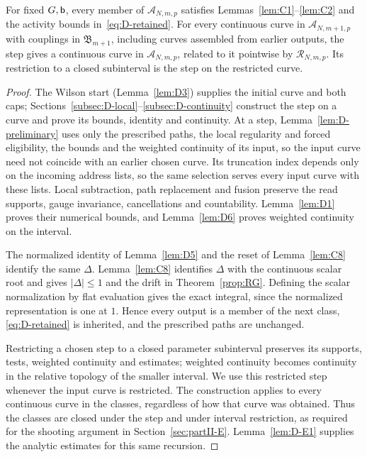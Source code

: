 \begin{lemma}\label{lem:D2}
For fixed $G,\mathsf{b}$, every member of $\mathcal A_{N,m,p}$ satisfies Lemmas~\ref{lem:C1}--\ref{lem:C2} and the activity bounds in~\eqref{eq:D-retained}. For every continuous curve in $\mathcal A_{N,m+1,p}$ with couplings in $\mathfrak B_{m+1}$, including curves assembled from earlier outputs, the step gives a continuous curve in $\mathcal A_{N,m,p}$, related to it pointwise by $\mathcal R_{N,m,p}$. Its restriction to a closed subinterval is the step on the restricted curve.
\end{lemma}
\begin{proof}
The Wilson start (Lemma~\ref{lem:D3}) supplies the initial curve and both caps; Sections~\ref{subsec:D-local}--\ref{subsec:D-continuity} construct the step on a curve and prove its bounds, identity and continuity. At a step, Lemma~\ref{lem:D-preliminary} uses only the prescribed paths, the local regularity and forced eligibility, the bounds and the weighted continuity of its input, so the input curve need not coincide with an earlier chosen curve. Its truncation index depends only on the incoming address lists, so the same selection serves every input curve with these lists. Local subtraction, path replacement and fusion preserve the read supports, gauge invariance, cancellations and countability. Lemma~\ref{lem:D1} proves their numerical bounds, and Lemma~\ref{lem:D6} proves weighted continuity on the interval.

The normalized identity of Lemma~\ref{lem:D5} and the reset of Lemma~\ref{lem:C8} identify the same $\Delta$. Lemma~\ref{lem:C8} identifies $\Delta$ with the continuous scalar root and gives $|\Delta|\le1$ and the drift in Theorem~\ref{prop:RG}. Defining the scalar normalization by flat evaluation gives the exact integral, since the normalized representation is one at $1$. Hence every output is a member of the next class, \eqref{eq:D-retained} is inherited, and the prescribed paths are unchanged.

Restricting a chosen step to a closed parameter subinterval preserves its supports, tests, weighted continuity and estimates; weighted continuity becomes continuity in the relative topology of the smaller interval. We use this restricted step whenever the input curve is restricted. The construction applies to every continuous curve in the classes, regardless of how that curve was obtained. Thus the classes are closed under the step and under interval restriction, as required for the shooting argument in Section~\ref{sec:partII-E}. Lemma~\ref{lem:D-E1} supplies the analytic estimates for this same recursion.
\end{proof}

